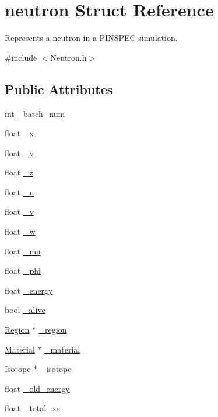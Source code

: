 \hypertarget{structneutron}{\section{neutron Struct Reference}
\label{structneutron}
}


Represents a neutron in a P\-I\-N\-S\-P\-E\-C simulation.  




{\ttfamily \#include $<$Neutron.\-h$>$}

\subsection*{Public Attributes}
\begin{DoxyCompactItemize}
\item 
int \hyperlink{structneutron_a0fc51df4fbcc6f41460e937a1f63ead2}{\-\_\-batch\-\_\-num}
\item 
float \hyperlink{structneutron_a14743394ac7bf443a57bccf9ab8beba5}{\-\_\-x}
\item 
float \hyperlink{structneutron_a9bc73caa5e8ea77020e7112299deec2e}{\-\_\-y}
\item 
float \hyperlink{structneutron_a8ee10b15ab1dc8294c84a0d742e15154}{\-\_\-z}
\item 
float \hyperlink{structneutron_a4ac5f314a0547708378d6b00a8863af0}{\-\_\-u}
\item 
float \hyperlink{structneutron_a382ebb7a5a3c7b971b283f0eb2e14ea6}{\-\_\-v}
\item 
float \hyperlink{structneutron_a2556e63540e62a318ca919cbe24f9794}{\-\_\-w}
\item 
float \hyperlink{structneutron_ad0addd2c6b874a54d838455358e7f6e8}{\-\_\-mu}
\item 
float \hyperlink{structneutron_ac17d30fc4c24666fcab05fe3d787b32d}{\-\_\-phi}
\item 
float \hyperlink{structneutron_a49d28706c0f2d9f3215fdf6da4e89f41}{\-\_\-energy}
\item 
bool \hyperlink{structneutron_ad3765df09268634efd4ff2107e3d150b}{\-\_\-alive}
\item 
\hyperlink{classRegion}{Region} $\ast$ \hyperlink{structneutron_ae09eb9ff92ce5578e2e683bc27e61e3b}{\-\_\-region}
\item 
\hyperlink{classMaterial}{Material} $\ast$ \hyperlink{structneutron_a7af200a58de9f8c535c1247053f70872}{\-\_\-material}
\item 
\hyperlink{classIsotope}{Isotope} $\ast$ \hyperlink{structneutron_a71574f549781c314902596d3ac4da58a}{\-\_\-isotope}
\item 
float \hyperlink{structneutron_a7f4a5f782cd613aed5b7832a198ffce2}{\-\_\-old\-\_\-energy}
\item 
float \hyperlink{structneutron_aac01f1ff8efae019839d37bb959fa33f}{\-\_\-total\-\_\-xs}
\end{DoxyCompactItemize}


